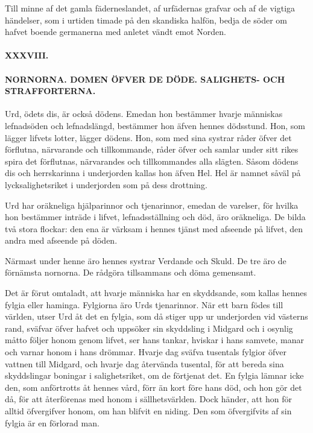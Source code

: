 Till minne af det gamla fäderneslandet, af urfädernas grafvar och af de
vigtiga händelser, som i urtiden timade på den skandiska halfön, bedja
de söder om hafvet boende germanerna med anletet vändt emot Norden.

\paragraph{XXXVIII.}

\paragraph{NORNORNA. DOMEN ÖFVER DE DÖDE. SALIGHETS- OCH STRAFFORTERNA.}

Urd, ödets dis, är också dödens. Emedan hon bestämmer hvarje människas
lefnadsöden och lefnadslängd, bestämmer hon äfven hennes dödsstund. Hon,
som lägger lifvets lotter, lägger dödens. Hon, som med sina systrar
råder öfver det förflutna, närvarande och tillkommande, råder öfver och
samlar under sitt rikes spira det förflutnas, närvarandes och
tillkommandes alla slägten. Såsom dödens dis och herrskarinna i
underjorden kallas hon äfven Hel. Hel är namnet såväl på
lycksalighetsriket i underjorden som på dess drottning.

Urd har oräkneliga hjälparinnor och tjenarinnor, emedan de varelser, för
hvilka hon bestämmer inträde i lifvet, lefnadsställning och död, äro
oräkneliga. De bilda två stora flockar: den ena är värksam i hennes
tjänst med afseende på lifvet, den andra med afseende på döden.

Närmast under henne äro hennes systrar Verdande och Skuld. De tre äro de
förnämsta nornorna. De rådgöra tillsammans och döma gemensamt.

Det är förut omtaladt, att hvarje människa har en skyddsande, som kallas
hennes fylgia eller haminga. Fylgiorna äro Urds tjenarinnor. När ett
barn födes till världen, utser Urd åt det en fylgia, som då stiger upp
ur underjorden vid västerns rand, sväfvar öfver hafvet och uppsöker sin
skyddsling i Midgard och i osynlig måtto följer honom genom
\protect\hypertarget{lb1625905.xhtmlux5cux23start180}{}{}\protect\hypertarget{lb1625905.xhtmlux5cux23start180-a}{}{}\protect\hypertarget{lb1625905.xhtmlux5cux23start180-b}{}{}\protect\hypertarget{lb1625905.xhtmlux5cux23start180-c}{}{}\protect\hypertarget{lb1625905.xhtmlux5cux23start180-d}{}{}
lifvet, ser hans tankar, hviskar i hans samvete, manar och varnar honom
i hans drömmar. Hvarje dag sväfva tusentals fylgior öfver vattnen till
Midgard, och hvarje dag återvända tusental, för att bereda sina
skyddslingar boningar i salighetsriket, om de förtjenat det. En fylgia
lämnar icke den, som anförtrotts åt hennes vård, förr än kort före hans
död, och hon gör det då, för att återförenas med honom i
sällhetsvärlden. Dock händer, att hon för alltid öfvergifver honom, om
han blifvit en niding. Den som öfvergifvits af sin fylgia är en förlorad
man.

